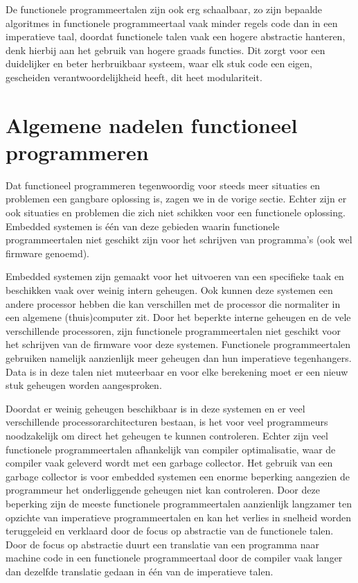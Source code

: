 \documentclass[twoside,twocolumn]{article}
\begin{document}
De functionele programmeertalen zijn ook erg schaalbaar, zo zijn bepaalde
algoritmes in functionele programmeertaal vaak minder regels code dan in een
imperatieve taal, doordat functionele talen vaak een hogere abstractie
hanteren, denk hierbij aan het gebruik van hogere graads functies. Dit zorgt
voor een duidelijker en beter herbruikbaar systeem, waar elk stuk code een
eigen, gescheiden verantwoordelijkheid heeft, dit heet modulariteit.


\section{Algemene nadelen functioneel programmeren}
Dat functioneel programmeren tegenwoordig voor steeds meer situaties en
problemen een gangbare oplossing is, zagen we in de vorige sectie. Echter zijn
er ook situaties en problemen die zich niet schikken voor een functionele
oplossing. Embedded systemen is \'e\'en van deze gebieden waarin functionele
programmeertalen niet geschikt zijn voor het schrijven van programma's
(ook wel firmware genoemd).

Embedded systemen zijn gemaakt voor het uitvoeren van een specifieke taak
en beschikken vaak over weinig intern geheugen. Ook kunnen deze systemen een
andere processor hebben die kan verschillen met de processor die normaliter in
een algemene (thuis)computer zit. Door het beperkte interne geheugen en de vele
verschillende processoren, zijn functionele programmeertalen niet geschikt
voor het schrijven van de firmware voor deze systemen. Functionele
programmeertalen gebruiken namelijk aanzienlijk meer geheugen dan hun
imperatieve tegenhangers. Data is in deze talen niet muteerbaar en voor elke
berekening moet er een nieuw stuk geheugen worden aangesproken.

Doordat er weinig geheugen beschikbaar is in deze systemen en er veel
verschillende processorarchitecturen bestaan, is het voor veel programmeurs
noodzakelijk om direct het geheugen te kunnen controleren. Echter zijn veel
functionele programmeertalen afhankelijk van compiler optimalisatie, waar de
compiler vaak geleverd wordt met een garbage collector. Het gebruik van een
garbage collector is voor embedded systemen een enorme beperking aangezien de
programmeur het onderliggende geheugen niet kan controleren. Door deze
beperking zijn de meeste functionele programmeertalen aanzienlijk langzamer ten
opzichte van imperatieve programmeertalen en kan het verlies in snelheid worden
teruggeleid en verklaard door de focus op abstractie van de functionele talen.
Door de focus op abstractie duurt een translatie van een programma naar machine
code in een functionele programmeertaal door de compiler vaak langer dan
dezelfde translatie gedaan in \'e\'en van de imperatieve talen.
\end{document}
